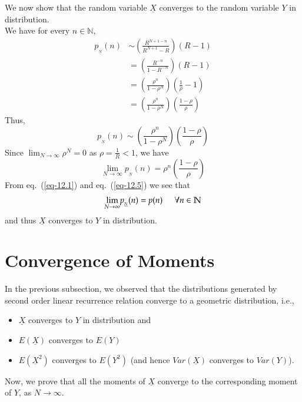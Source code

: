 \begin{multicols}{2}
We now show that the random variable $\underline{X}$ converges to the random variable $Y$ in distribution. \\
We have for every $n \in \mathbb N$,
\begin{align}
p_{_{\underline{N}}}(n) &\sim \left(\displaystyle{\frac{R^{N+1-n}}{R^{N+1}- R}}\right)(R-1)\nonumber\\
&= \left(\displaystyle{\frac{R^{-n}}{1-R^{-N}}}\right)(R-1)\nonumber\\
&= \left(\displaystyle{\frac{\rho^{n}}{1-\rho^{N}}}\right)\left(\displaystyle{\frac{1}{\rho}}-1\right)\nonumber\\
&= \left(\displaystyle{\frac{\rho^{n}}{1-\rho^{N}}}\right)\left(\displaystyle{\frac{1-\rho}{\rho}}\right)\nonumber
\end{align}
Thus,
\begin{equation}\nonumber
p_{_{\underline{N}}}(n) \sim \left(\displaystyle{\frac{\rho^{n}}{1-\rho^{N}}}\right)\left(\displaystyle{\frac{1-\rho}{\rho}}\right)
\end{equation}
Since $\displaystyle{\lim_{N \rightarrow \infty}}\rho^N = 0$ as $\rho = \displaystyle{\frac{1}{R}} < 1$, we have
\begin{equation}
\displaystyle{\lim_{N \rightarrow \infty}}p_{_{\underline{N}}}(n) = \rho^{n}\left(\displaystyle{\frac{1-\rho}{\rho}}\right)\label{eq-12.5}
\end{equation}
From eq.~(\ref{eq-12.1}) and eq.~(\ref{eq-12.5}) we see that
\begin{equation}
\displaystyle{\lim_{N \rightarrow \infty}}p_{_{\underline{N}}}(n) = p(n) \hspace{0.2in} \forall n \in \mathbb N\label{eq-12.6}
\end{equation}
and thus $\underline{X}$ converges to $Y$ in distribution.

\section{Convergence of Moments}\label{section-13}
In the previous subsection, we observed that the distributions generated by second order linear recurrence relation converge to a geometric distribution, i.e., 
\begin{itemize}
\item $\underline{X}$ converges to $Y$ in distribution and 
\item $E(\underline{X})$ converges to $E(Y)$  
\item $E(\underline{X}^2)$ converges to $E(Y^2)$ (and hence $Var(\underline{X})$ converges to $Var(Y)$).
\end{itemize}
Now, we prove that all the moments of $\underline{X}$ converge to the corresponding moment of $Y$, as $N \rightarrow \infty$.


\end{multicols}
